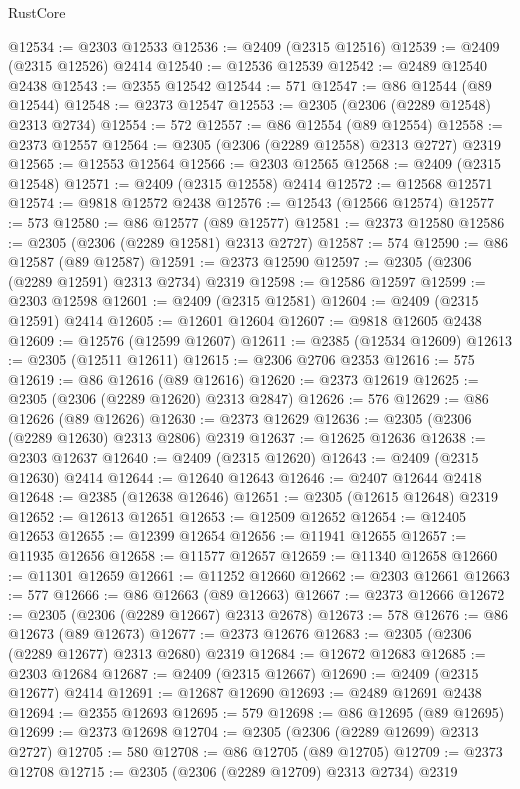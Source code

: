 \begin{lexlean}{RustCore}
\begin{coremodule}
@12534 := @2303 @12533
@12536 := @2409 (@2315 @12516)
@12539 := @2409 (@2315 @12526) @2414
@12540 := @12536 @12539
@12542 := @2489 @12540 @2438
@12543 := @2355 @12542
@12544 := 571
@12547 := @86 @12544 (@89 @12544)
@12548 := @2373 @12547
@12553 := @2305 (@2306 (@2289 @12548) @2313 @2734)
@12554 := 572
@12557 := @86 @12554 (@89 @12554)
@12558 := @2373 @12557
@12564 := @2305 (@2306 (@2289 @12558) @2313 @2727) @2319
@12565 := @12553 @12564
@12566 := @2303 @12565
@12568 := @2409 (@2315 @12548)
@12571 := @2409 (@2315 @12558) @2414
@12572 := @12568 @12571
@12574 := @9818 @12572 @2438
@12576 := @12543 (@12566 @12574)
@12577 := 573
@12580 := @86 @12577 (@89 @12577)
@12581 := @2373 @12580
@12586 := @2305 (@2306 (@2289 @12581) @2313 @2727)
@12587 := 574
@12590 := @86 @12587 (@89 @12587)
@12591 := @2373 @12590
@12597 := @2305 (@2306 (@2289 @12591) @2313 @2734) @2319
@12598 := @12586 @12597
@12599 := @2303 @12598
@12601 := @2409 (@2315 @12581)
@12604 := @2409 (@2315 @12591) @2414
@12605 := @12601 @12604
@12607 := @9818 @12605 @2438
@12609 := @12576 (@12599 @12607)
@12611 := @2385 (@12534 @12609)
@12613 := @2305 (@12511 @12611)
@12615 := @2306 @2706 @2353
@12616 := 575
@12619 := @86 @12616 (@89 @12616)
@12620 := @2373 @12619
@12625 := @2305 (@2306 (@2289 @12620) @2313 @2847)
@12626 := 576
@12629 := @86 @12626 (@89 @12626)
@12630 := @2373 @12629
@12636 := @2305 (@2306 (@2289 @12630) @2313 @2806) @2319
@12637 := @12625 @12636
@12638 := @2303 @12637
@12640 := @2409 (@2315 @12620)
@12643 := @2409 (@2315 @12630) @2414
@12644 := @12640 @12643
@12646 := @2407 @12644 @2418
@12648 := @2385 (@12638 @12646)
@12651 := @2305 (@12615 @12648) @2319
@12652 := @12613 @12651
@12653 := @12509 @12652
@12654 := @12405 @12653
@12655 := @12399 @12654
@12656 := @11941 @12655
@12657 := @11935 @12656
@12658 := @11577 @12657
@12659 := @11340 @12658
@12660 := @11301 @12659
@12661 := @11252 @12660
@12662 := @2303 @12661
@12663 := 577
@12666 := @86 @12663 (@89 @12663)
@12667 := @2373 @12666
@12672 := @2305 (@2306 (@2289 @12667) @2313 @2678)
@12673 := 578
@12676 := @86 @12673 (@89 @12673)
@12677 := @2373 @12676
@12683 := @2305 (@2306 (@2289 @12677) @2313 @2680) @2319
@12684 := @12672 @12683
@12685 := @2303 @12684
@12687 := @2409 (@2315 @12667)
@12690 := @2409 (@2315 @12677) @2414
@12691 := @12687 @12690
@12693 := @2489 @12691 @2438
@12694 := @2355 @12693
@12695 := 579
@12698 := @86 @12695 (@89 @12695)
@12699 := @2373 @12698
@12704 := @2305 (@2306 (@2289 @12699) @2313 @2727)
@12705 := 580
@12708 := @86 @12705 (@89 @12705)
@12709 := @2373 @12708
@12715 := @2305 (@2306 (@2289 @12709) @2313 @2734) @2319

\end{coremodule}
\end{lexlean}
